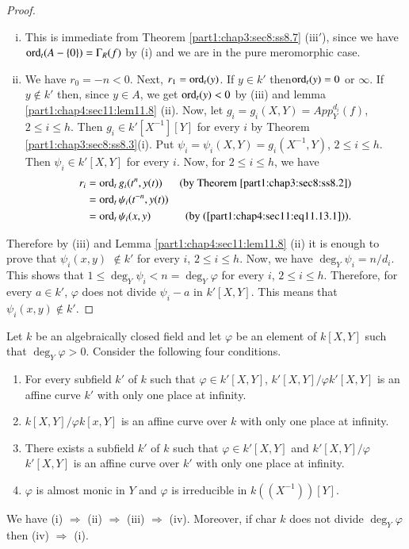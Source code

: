 \begin{proof}
\begin{enumerate}[(i)]
      \item This is immediate from Theorem
        \ref{part1:chap3:sec8:ss8.7} (iii$'$), since we have $\operatorname{ord}_t (A
        - \{ 0\}) = \Gamma_R(f)$ by (i) and we are in the pure
        meromorphic case.
        \item We have $r_0= -n < 0$. Next, $r_1= \operatorname{ord}_t (y)$. If $y
          \in k'$ then\pageoriginale $\operatorname{ord}_t (y) =0$ or $\infty$. If
          $y \notin k'$ then, since $y \in A$, we get $\operatorname{ord}_t (y) < 0$
          by (iii) and lemma \ref{part1:chap4:sec11:lem11.8}
          (ii). Now, let $g_i = g_i (X, Y)= App_Y^{d_i}(f)$, $2 \leq i
          \leq h$. Then $g_i \in k' [X^{-1}][Y]$ for every $i$ by
          Theorem \ref{part1:chap3:sec8:ss8.3}(i). Put $\psi_i =
          \psi_i (X, Y)= g_i (X^{-1}, Y)$, $2 \leq i \leq h$. Then
          $\psi_i \in k' [X, Y]$ for every $i$. Now, for $2 \leq i
          \leq h$, we have 
          \begin{align*}
            r_ i & = \operatorname{ord}_t g_i (t^n, y(t)) & \text{(by
              Theorem \ref{part1:chap3:sec8:ss8.2})}\\
            & = \operatorname{ord}_t \psi_i (t^{-n}, y(t)) \\
            & = \operatorname{ord}_t \psi_i (x, y) &
            \text{(by (\ref{part1:chap4:sec11:eq11.13.1}))}.
          \end{align*}
\end{enumerate}
Therefore by (iii) and Lemma \ref{part1:chap4:sec11:lem11.8} (ii) it
is enough to prove that $\psi_i (x, y)$ $\notin k'$ for every $i$, $2
\leq i \leq h$. Now, we have $\deg_Y \psi_i = n/d_i$. This shows that
$1 \leq \deg_Y \psi_i < n= \deg_Y \varphi$ for every $i$, $2 \leq i
\leq h$. Therefore, for every $a \in k'$, $\varphi$ does not divide
$\psi_i-a$ in $k' [X, Y]$. This means that $\psi_i (x, y) \notin k'$.
\end{proof}

\begin{thm}\label{part1:chap4:sec11:thm11.15}
  Let $k$ be an algebraically closed field and let $\varphi$ be an
  element of $k [X, Y]$ such that $\deg_Y \varphi> 0$. Consider the
  following four conditions.
  \begin{enumerate}[\rm (i)]
    \item For every subfield $k'$ of $k$ such that $\varphi \in k' [X,
    Y]$, $k' [X, Y]/\varphi k' [X, Y]$ is an affine curve $k'$ with
      only one place at infinity.
      \item $k[X, Y]/\varphi k[x, Y]$ is an affine curve over $k$ with
        only one place at infinity.
        \item There exists a subfield $k'$ of $k$ such that $\varphi
          \in k' [X, Y]$ and $k' [X, Y]/\varphi$ $k' [X, Y]$ is an
          affine curve over $k'$ with only one place at infinity.
          \item $\varphi$ is almost monic in $Y$ and $\varphi$ is
            irreducible in $k((X^{-1}))[Y]$.
  \end{enumerate}
  We have (i) $\Rightarrow$ (ii) $\Rightarrow$ (iii) $\Rightarrow$
  (iv). Moreover, if char $k$ does not divide $\deg_Y \varphi$ then
  (iv) $\Rightarrow$ (i). 
\end{thm}

